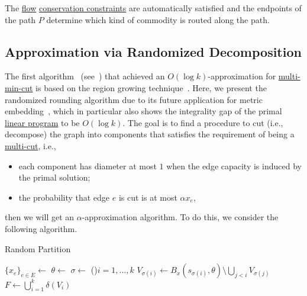 \begin{note}
	The \hyperref[def:flow]{flow} \hyperref[def:flow-conservation]{conservation constraints} are automatically satisfied and the endpoints of the path \(P\) determine which kind of commodity is routed along the path.
\end{note}

\subsection{Approximation via Randomized Decomposition}
The first algorithm~\cite{garg1993approximate} (see~\cite{vazirani2001approximation,williamson2011design}) that achieved an \(O(\log k)\)-approximation for \hyperref[prb:multi-min-cut]{multi-min-cut} is based on the region growing technique~\cite{leighton1999multicommodity}. Here, we present the randomized rounding algorithm due to its future application for metric embedding~\cite{calinescu2005approximation}, which in particular also shows the integrality gap of the primal \hyperref[eq:multi-min-cut-LP]{linear program} to be \(O(\log k)\). The goal is to find a procedure to cut (i.e., decompose) the graph into components that satisfies the requirement of being a \hyperref[prb:multi-min-cut]{multi-cut}, i.e.,
\begin{itemize}
	\item each component has diameter at most \(1\) when the edge capacity is induced by the primal solution;
	\item the probability that edge \(e\) is cut is at most \(\alpha x_e\),
\end{itemize}
then we will get an \(\alpha \)-approximation algorithm. To do this, we consider the following algorithm.

\begin{algorithm}[H]\label{algo:multi-cut-random-partition}
	\DontPrintSemicolon{}
	\caption{Random Partition~\cite{calinescu2005approximation}}

	\BlankLine

	\(\{ x_e \} _{e\in E} \gets\)
	\(\theta \gets\)\uniform{\([0, 1 / 2)\)}\;
	\(\sigma \gets\)
	\For(){\(i = 1, \dots , k\)}{
		\(V_{\sigma (i)} \gets B_x(s_{\sigma (i)}, \theta ) \setminus \bigcup_{j < i} V_{\sigma (j)}\)\label{algo:multi-cut-random-partition-grab}\;
	}
	\(F \gets \bigcup_{i=1}^{k} \delta (V_i)\)\;
	\;
\end{algorithm}

